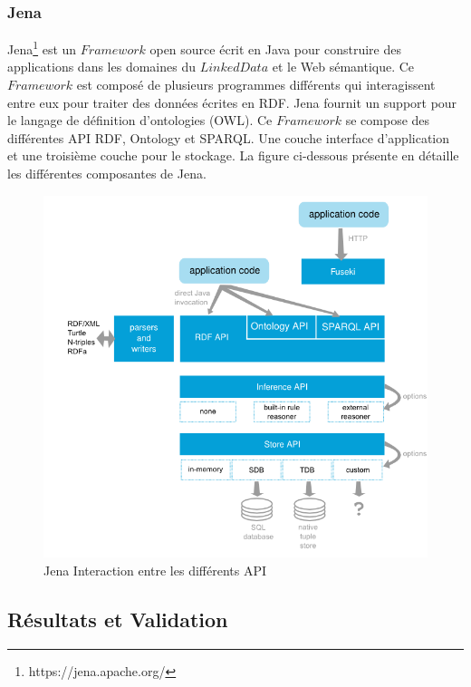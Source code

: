 \documentclass[12pt,a4	]{report}
\begin{document}
\subsubsection*{Jena}
Jena\footnote{https://jena.apache.org/} est un $Framework$ open source écrit en Java pour construire des applications dans les domaines du
$LinkedData$ et le Web sémantique. Ce $Framework$ est composé de plusieurs programmes différents qui interagissent entre eux pour traiter des données écrites en RDF. Jena fournit un support pour le langage de définition d'ontologies (OWL). Ce $Framework$ se compose des différentes API RDF, Ontology et SPARQL. Une couche interface d'application et une troisième couche pour le stockage. La figure ci-dessous présente en détaille les différentes composantes de Jena.
 \begin{figure}[H]
        \centering
                \includegraphics[width=13cm]{Jena.png}
               \caption{Jena Interaction entre les différents API}
\end{figure}
\subsection*{Résultats et Validation}
\end{document}
